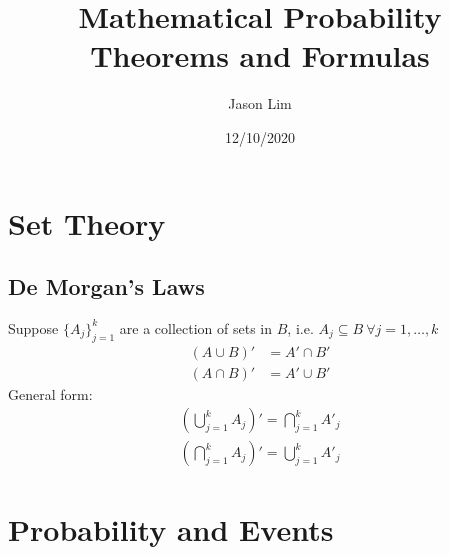 \documentclass[
]{article}
\title{Mathematical Probability Theorems and Formulas}
\author{Jason Lim}
\date{12/10/2020}
\theoremstyle{definition}
\theoremstyle{definition}
\theoremstyle{definition}
\theoremstyle{remark}
\begin{document}
\maketitle

{
  \setcounter{tocdepth}{2}
  \tableofcontents
}

\pagebreak

\hypertarget{settheory}{
  \section{Set Theory}\label{settheory}}

\subsection{De Morgan's Laws}

Suppose $\{A_j\}_{j=1}^k$ are a collection of sets in $B$, i.e. $A_j\subseteq B\ \forall j=1,\ldots,k$
\begin{align*}
  (A\cup B)' & =A'\cap B' \\
  (A\cap B)' & =A'\cup B'
\end{align*}
General form:
\begin{align*}
  \left(\bigcup_{j=1}^k A_j\right)'=\bigcap_{j=1}^k A'_j \\
  \left(\bigcap_{j=1}^k A_j\right)'=\bigcup_{j=1}^k A'_j
\end{align*}

\hypertarget{probandevents}{
  \section{Probability and Events}}
\end{document}
